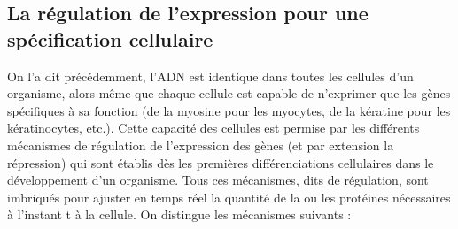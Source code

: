 \subsection{La régulation de l'expression pour une spécification cellulaire}

On l'a dit précédemment, l'ADN est identique dans toutes les cellules d'un organisme, alors même que chaque cellule est capable de n'exprimer que les gènes spécifiques à sa fonction (de la myosine pour les myocytes, de la kératine pour les kératinocytes, etc.). Cette capacité des cellules est permise par les différents mécanismes de régulation de l'expression des gènes (et par extension la répression) qui sont établis dès les premières différenciations cellulaires dans le développement d'un organisme. Tous ces mécanismes, dits de régulation, sont imbriqués pour ajuster en temps réel la quantité de la ou les protéines nécessaires à l'instant t à la cellule. On distingue les mécanismes suivants : 
